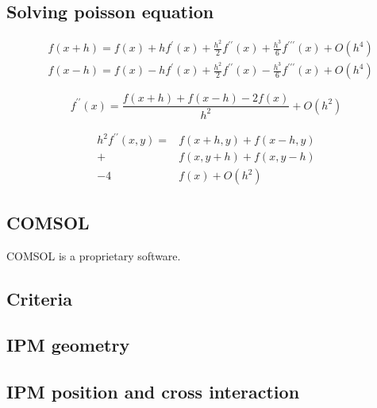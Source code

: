 \begin{refsection}
	\subsection{Solving poisson equation}

	\begin{align}
		 & f(x+h) = f(x)+hf^{\prime}(x)
		+\frac{h^2}{2}f^{\prime\prime}(x)+\frac{h^3}{6}f^{\prime\prime\prime}(x) + O(h^{4}) \\
		 & f(x-h) = f(x)-hf^{\prime}(x)
		+\frac{h^2}{2}f^{\prime\prime}(x)-\frac{h^3}{6}f^{\prime\prime\prime}(x) + O(h^{4})
	\end{align}

	\begin{equation}
		f^{\prime\prime}(x) = \frac{f(x+h) + f(x-h) - 2f(x)}{h^{2}} + O(h^{2})
	\end{equation}

	\begin{equation}
		\begin{split}
			h^{2}f^{\prime\prime}(x,y)=&f(x+h,y) + f(x-h,y) \\
			+ &f(x,y+h) + f(x,y-h) \\
			- 4&f(x)+ O(h^{2})
		\end{split}
	\end{equation}

	\subsection{COMSOL}
	COMSOL\cite{comsol2018} is a proprietary software.\cite{comsolacdc2018}

	

	

	\cite{cststudio2018}\cite{ansys2018}\cite{couloumb2018}
	\subsection{Criteria}
	

	\subsection{IPM geometry}
	\subsection{IPM position and cross interaction}

\end{refsection}
